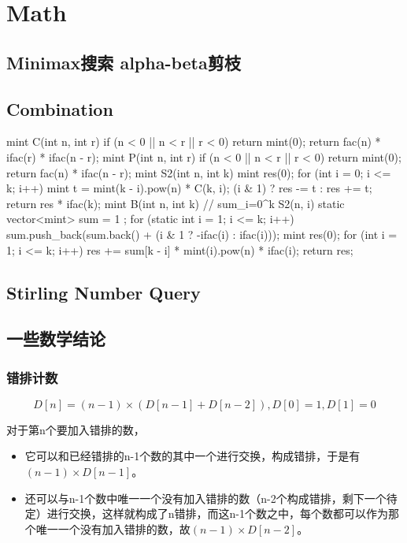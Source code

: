 \chapter{Math}
\section{Minimax搜索 alpha-beta剪枝}

\section{Combination}
\begin{cpplist}
mint C(int n, int r) {
  if (n < 0 || n < r || r < 0) return mint(0);
  return fac(n) * ifac(r) * ifac(n - r);
}
mint P(int n, int r) {
  if (n < 0 || n < r || r < 0) return mint(0);
  return fac(n) * ifac(n - r);
}
mint S2(int n, int k) {
  mint res(0);
  for (int i = 0; i <= k; i++) {
    mint t = mint(k - i).pow(n) * C(k, i);
    (i & 1) ? res -= t : res += t;
  }
  return res * ifac(k);
}
mint B(int n, int k) { // sum_{i=0}^{k} S2(n, i)
  static vector<mint> sum = { 1 };
  for (static int i = 1; i <= k; i++) {
    sum.push_back(sum.back() + (i & 1 ? -ifac(i) : ifac(i)));
  }
  mint res(0);
  for (int i = 1; i <= k; i++) {
    res += sum[k - i] * mint(i).pow(n) * ifac(i);
  }
  return res;
}
\end{cpplist}

\section{Stirling Number Query}

\section{一些数学结论}
\subsection{错排计数}
\[ D[n] = (n-1)\times(D[n-1]+D[n-2]), D[0] = 1, D[1] = 0 \]

对于第n个要加入错排的数，
\begin{itemize}
  \item 它可以和已经错排的n-1个数的其中一个进行交换，构成错排，于是有 $(n-1)\times D[n-1]$。
  \item 还可以与n-1个数中唯一一个没有加入错排的数（n-2个构成错排，剩下一个待定）进行交换，这样就构成了n错排，而这n-1个数之中，每个数都可以作为那个唯一一个没有加入错排的数，故$(n-1)\times D[n-2]$。
\end{itemize}

